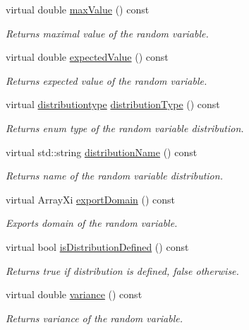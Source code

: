 \begin{DoxyCompactItemize}
virtual double \hyperlink{class_c_categorical_d_r_v_aa5d047a29e2ff173134e60a04f24eb1c}{max\-Value} () const 
\begin{DoxyCompactList}\small\item\em Returns maximal value of the random variable. \end{DoxyCompactList}\item 
virtual double \hyperlink{class_c_categorical_d_r_v_ad771cb6295a706cf14e666ab097d4751}{expected\-Value} () const 
\begin{DoxyCompactList}\small\item\em Returns expected value of the random variable. \end{DoxyCompactList}\item 
virtual \hyperlink{class_c_random_variable_a80d2a87c43847274138b51f7d713d7f1}{distributiontype} \hyperlink{class_c_categorical_d_r_v_affe36486c2cc2b8b35018bd0557cf4d4}{distribution\-Type} () const 
\begin{DoxyCompactList}\small\item\em Returns enum type of the random variable distribution. \end{DoxyCompactList}\item 
virtual std\-::string \hyperlink{class_c_categorical_d_r_v_adbecb8ad887cdbe9c1f39858c415e70a}{distribution\-Name} () const 
\begin{DoxyCompactList}\small\item\em Returns name of the random variable distribution. \end{DoxyCompactList}\item 
virtual Array\-Xi \hyperlink{class_c_categorical_d_r_v_a67bb1a1664827e7221af1178b78c7850}{export\-Domain} () const 
\begin{DoxyCompactList}\small\item\em Exports domain of the random variable. \end{DoxyCompactList}\item 
virtual bool \hyperlink{class_c_categorical_d_r_v_a43881a5705bc5c0de35488ca13fb31e6}{is\-Distribution\-Defined} () const 
\begin{DoxyCompactList}\small\item\em Returns true if distribution is defined, false otherwise. \end{DoxyCompactList}\item 
virtual double \hyperlink{class_c_categorical_d_r_v_a78e27950e4b4e248abd75305b55d0519}{variance} () const 
\begin{DoxyCompactList}\small\item\em Returns variance of the random variable. \end{DoxyCompactList}\end{DoxyCompactItemize}
